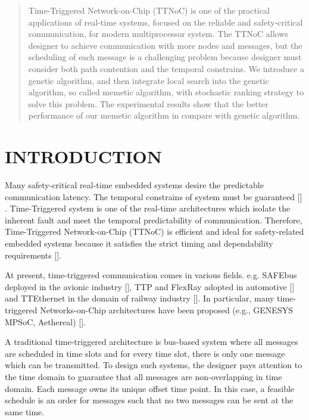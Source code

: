\documentclass[conference]{IEEEtran}
\begin{document}
\begin{abstract}
Time-Triggered Network-on-Chip (TTNoC) is one of the practical applications of real-time systems, focused on the reliable and safety-critical communication, for modern multiprocessor system. The TTNoC allows designer to achieve communication with more nodes and messages, but the scheduling of each message is a challenging problem because designer must consider both path contention and the temporal constrains. We introduce a genetic algorithm, and then integrate local search into the genetic algorithm, so called memetic algorithm, with stochastic ranking strategy to solve this problem. The experimental results show that the better performance of our memetic algorithm in compare with genetic algorithm.
\end{abstract}

%
\IEEEpeerreviewmaketitle



\section{INTRODUCTION}
Many safety-critical real-time embedded systems desire the predictable communication latency. The temporal constrains of system must be guaranteed [] . Time-Triggered system is one of the real-time architectures which isolate the inherent fault and meet the temporal predictability of communication. Therefore, Time-Triggered Network-on-Chip (TTNoC) is efficient and ideal for safety-related embedded systems because it satisfies the strict timing and dependability requirements [].

At present, time-triggered communication comes in various fields. e.g. SAFEbus deployed in the avionic industry [], TTP and FlexRay adopted in automotive  [] and TTEthernet in the domain of railway industry []. In particular, many time-triggered Networks-on-Chip architectures have been proposed (e.g., GENESYS MPSoC, Aethereal) [].

A traditional time-triggered architecture is bus-based system where all messages are scheduled in time slots and for every time slot, there is only one message which can be transmitted. To design such systems, the designer pays attention to the time domain to guarantee that all messages are non-overlapping in time domain. Each message owns its unique offset time point. In this case, a feasible schedule is an order for messages such that no two messages can be sent at the same time. 
\end{document}

